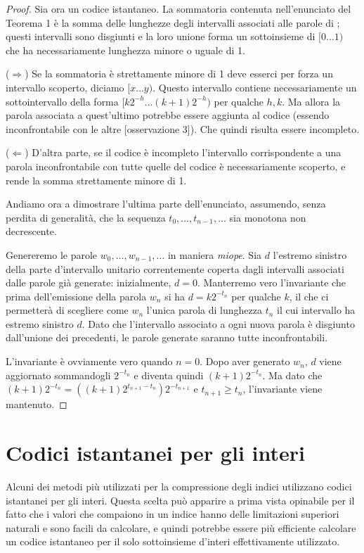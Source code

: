 \begin{proof}
	Sia ora  un codice istantaneo. La sommatoria contenuta nell'enunciato del Teorema 1 è la somma delle lunghezze degli intervalli associati alle parole di ; questi intervalli sono disgiunti e la loro unione forma un sottoinsieme di $[0\dots1)$ che ha necessariamente lunghezza minore o uguale di 1.

	($\Longrightarrow$) Se la sommatoria è strettamente minore di 1 deve esserci per forza un intervallo scoperto, diciamo $[x \dots y)$. Questo intervallo contiene necessariamente un sottointervallo della forma $[k2^{-h} \dots (k + 1)2^{-h})$ per qualche $h, k$. Ma allora la parola associata a quest'ultimo potrebbe essere aggiunta al codice (essendo inconfrontabile con le altre [osservazione 3]). Che quindi risulta essere incompleto.

	($\Longleftarrow$) D'altra parte, se il codice è incompleto l'intervallo corrispondente a una parola inconfrontabile con tutte quelle del codice è necessariamente scoperto, e rende la somma strettamente minore di 1.

	Andiamo ora a dimostrare l'ultima parte dell'enunciato, assumendo, senza perdita di generalità, che la sequenza $t_0, \dots, t_{n - 1}, \dots$ sia monotona non decrescente.

	Genereremo le parole  $w_0, \dots, w_{n - 1}, \dots$ in maniera \textit{miope}. Sia $d$ l'estremo sinistro della parte d'intervallo unitario correntemente coperta dagli intervalli associati dalle parole già generate: inizialmente, $d = 0$. Manterremo vero l'invariante che prima dell'emissione della parola $w_n$ si ha $d = k2^{-t_n}$ per qualche $k$, il che ci permetterà di scegliere come $w_n$ l'unica parola di lunghezza $t_n$ il cui intervallo ha estremo sinistro $d$. Dato che l'intervallo associato a ogni nuova parola è disgiunto dall'unione dei precedenti, le parole generate saranno tutte inconfrontabili.

	L'invariante è ovviamente vero quando $n = 0$. Dopo aver generato $w_n$, $d$ viene aggiornato sommandogli $2^{-t_n}$ e diventa quindi $(k + 1)2^{-t_n}$. Ma dato che $(k + 1)2^{-t_n} = ((k + 1)2^{t_{n + 1}-t_n})2^{-t_{n + 1}}$ e $t_{n + 1} \geq t_n$, l'invariante viene mantenuto.
	\qedhere
\end{proof}
\section{Codici istantanei per gli interi}
Alcuni dei metodi più utilizzati per la compressione degli indici utilizzano codici istantanei per gli interi. Questa scelta può apparire a prima vista opinabile per il fatto che i valori che compaiono in un indice hanno delle limitazioni superiori naturali e sono facili da calcolare, e quindi potrebbe essere più efficiente calcolare un codice istantaneo per il solo sottoinsieme d'interi effettivamente utilizzato.

